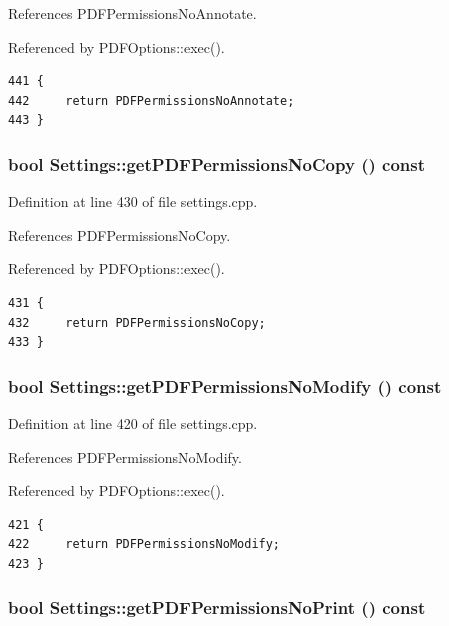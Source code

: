 References PDFPermissions\-No\-Annotate.

Referenced by PDFOptions::exec().

\footnotesize\begin{verbatim}441 {
442     return PDFPermissionsNoAnnotate;
443 }
\end{verbatim}\normalsize 


\hypertarget{classSettings_a54}{
\subsubsection[getPDFPermissionsNoCopy]{\setlength{\rightskip}{0pt plus 5cm}bool Settings::get\-PDFPermissions\-No\-Copy () const}}
\label{classSettings_a54}


Definition at line 430 of file settings.cpp.

References PDFPermissions\-No\-Copy.

Referenced by PDFOptions::exec().

\footnotesize\begin{verbatim}431 {
432     return PDFPermissionsNoCopy;
433 }
\end{verbatim}\normalsize 


\hypertarget{classSettings_a52}{
\subsubsection[getPDFPermissionsNoModify]{\setlength{\rightskip}{0pt plus 5cm}bool Settings::get\-PDFPermissions\-No\-Modify () const}}
\label{classSettings_a52}


Definition at line 420 of file settings.cpp.

References PDFPermissions\-No\-Modify.

Referenced by PDFOptions::exec().

\footnotesize\begin{verbatim}421 {
422     return PDFPermissionsNoModify;
423 }
\end{verbatim}\normalsize 


\hypertarget{classSettings_a50}{
\subsubsection[getPDFPermissionsNoPrint]{\setlength{\rightskip}{0pt plus 5cm}bool Settings::get\-PDFPermissions\-No\-Print () const}}
\label{classSettings_a50}


